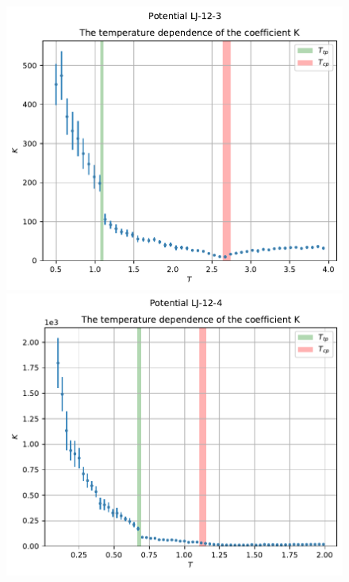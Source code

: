 \documentclass[pdf,hyperref={unicode}]{beamer}
\begin{document}
\begin{frame}
\transdissolve[duration=0.2]

\begin{columns}

\begin{column}{0.7\linewidth}
{
\begin{figure}[h]
\begin{center}
\begin{minipage}[h]{0.45\linewidth}
\includegraphics[width=\textwidth, keepaspectratio]{plot_K_Potential LJ-12-3_1}
\end{minipage}
\begin{minipage}[h]{0.45\linewidth}
\includegraphics[width=\textwidth, keepaspectratio]{plot_K_Potential LJ-12-4_1}
\end{minipage}


\end{center}
\end{figure}}
\end{column}
\end{columns}
\end{frame}
\end{document}
